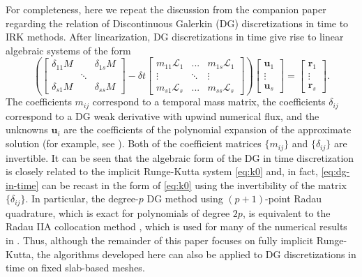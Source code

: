 \documentclass[review]{siamart}
\begin{document}
For completeness, here we repeat the discussion from the companion paper \cite{irk1}
regarding the relation of Discontinuous Galerkin (DG) discretizations in time to IRK
methods. After linearization, DG discretizations in time give rise to linear
algebraic systems of the form
\begin{equation} \label{eq:dg-in-time}
	\left( \begin{bmatrix}
		\delta_{11} M  & & \delta_{1s} M \\
		& \ddots \\
		\delta_{s1} M & & \delta_{ss} M
	\end{bmatrix}
	- \delta t \begin{bmatrix}
		m_{11}\mathcal{L}_1 & ... & m_{1s}\mathcal{L}_1 \\
		\vdots & \ddots & \vdots \\
		m_{s1}\mathcal{L}_s & ... & m_{ss} \mathcal{L}_s
	\end{bmatrix} \right)
		\begin{bmatrix} \mathbf{u}_1 \\ \vdots \\ \mathbf{u}_s \end{bmatrix}
		= \begin{bmatrix} \mathbf{r}_1 \\ \vdots \\ \mathbf{r}_s \end{bmatrix}.
\end{equation}
The coefficients $m_{ij}$ correspond to a temporal mass matrix, the coefficients
$\delta_{ij}$ correspond to a DG weak derivative with upwind numerical flux, and
the unknowns $\mathbf{u}_i$ are the coefficients of the polynomial expansion of
the approximate solution (for example, see \cite{hn,Akrivis2011,Lasaint1974,Makridakis2006}).
Both of the coefficient matrices $\{m_{ij}\}$ and $\{\delta_{ij}\}$ are
invertible. It can be seen that the algebraic form of the DG in time
discretization is closely related to the implicit Runge-Kutta system
\eqref{eq:k0} and, in fact, \eqref{eq:dg-in-time} can be recast in the form of
\eqref{eq:k0} using the invertibility of the matrix $\{\delta_{ij}\}$. In
particular, the degree-$p$ DG method using $(p+1)$-point
Radau quadrature, which is exact for polynomials of degree $2p$, is equivalent
to the Radau IIA collocation method \cite{Makridakis2006}, which is used for
many of the numerical results in .
Thus, although the remainder of this paper focuses on fully implicit Runge-Kutta,
the algorithms developed here can also be applied to DG discretizations in time on
fixed slab-based meshes.
\end{document}

